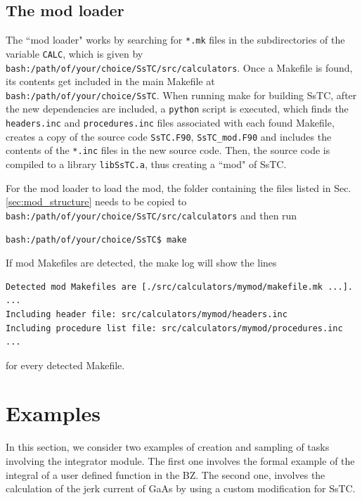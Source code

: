 \documentclass[10pt,a4paper]{article}
\begin{document}
\subsection{The mod loader}\label{sec:mod_loader}
The ``mod loader" works by searching for \verb|*.mk| files in the subdirectories of the variable \verb|CALC|, which is given by \verb|bash:/path/of/your/choice/SsTC/src/calculators|. Once a Makefile is found, its contents get included in the main Makefile at \verb|bash:/path/of/your/choice/SsTC|. When running make for building SsTC, after the new dependencies are included, a \verb|python| script is executed, which finds the \verb|headers.inc| and \verb|procedures.inc| files associated with each found Makefile, creates a copy of the source code \verb|SsTC.F90|, \verb|SsTC_mod.F90| and includes the contents of the \verb|*.inc| files in the new source code. Then, the source code is compiled to a library \verb|libSsTC.a|, thus creating a ``mod" of SsTC.

For the mod loader to load the mod, the folder containing the files listed in Sec. \ref{sec:mod_structure} needs to be copied to \verb|bash:/path/of/your/choice/SsTC/src/calculators| and then run
\begin{codebox}{}
\begin{verbatim}
bash:/path/of/your/choice/SsTC$ make
\end{verbatim}
\end{codebox}
If mod Makefiles are detected, the make log will show the lines
\begin{codebox}{}
\begin{verbatim}
Detected mod Makefiles are [./src/calculators/mymod/makefile.mk ...].
...
Including header file: src/calculators/mymod/headers.inc
Including procedure list file: src/calculators/mymod/procedures.inc
...
\end{verbatim}
\end{codebox}
for every detected Makefile.
\section{Examples}
In this section, we consider two examples of creation and sampling of tasks involving the integrator module. The first one involves the formal example of the integral of a user defined function in the BZ. The second one, involves the calculation of the jerk current of GaAs by using a custom modification for SsTC.
\end{document}
